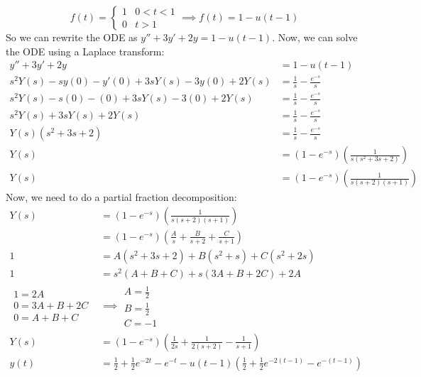 \documentclass[letterpaper, fontsize=11pt]{scrartcl} %
\numberwithin{equation}{section} %
\numberwithin{figure}{section} %
\numberwithin{table}{section} %
\begin{document}
\begin{enumerate}
\begin{enumerate}
\[ 
f(t) = \begin{cases} 
      1 & 0 < t < 1 \\
      0 & t > 1 
   \end{cases}
   \implies
   f(t) = 1 - u(t-1)
\]
So we can rewrite the ODE as $y'' + 3y' + 2y = 1 - u(t-1)$. Now, we can solve the ODE using a Laplace transform:
\begin{align*}
y'' + 3y' + 2y &= 1 - u(t-1)\\
s^2 Y(s) - sy(0) - y'(0) + 3sY(s) - 3y(0) + 2Y(s) &= \frac{1}{s} - \frac{e^{-s}}{s}\\
s^2 Y(s) - s(0) - (0) + 3sY(s) - 3(0) + 2Y(s) &= \frac{1}{s} - \frac{e^{-s}}{s}\\
s^2 Y(s) + 3sY(s) + 2Y(s) &= \frac{1}{s} - \frac{e^{-s}}{s}\\
Y(s)\left(s^2 + 3s + 2\right) &= \frac{1}{s} - \frac{e^{-s}}{s}\\
Y(s) &= \left(1 - e^{-s}\right) \left( \frac{1}{s(s^2 + 3s + 2)}\right)\\
Y(s) &= \left(1 - e^{-s}\right) \left( \frac{1}{s(s+2)(s+1)}\right)
\end{align*}
Now, we need to do a partial fraction decomposition:
\begin{align*}
Y(s) &= \left(1 - e^{-s}\right) \left( \frac{1}{s(s+2)(s+1)}\right)\\
&= \left(1 - e^{-s}\right) \left(\frac{A}{s} + \frac{B}{s+2} + \frac{C}{s+1}\right)\\
1&= A\left(s^2 + 3s + 2 \right) + B \left(s^2 + s \right) + C \left(s^2 + 2s\right) \\
1&= s^2 ( A + B + C) + s(3A + B + 2C) + 2A \\
\begin{array}{c}
1 = 2A \\
0 = 3A + B + 2C \\
0 = A + B + C
\end{array}
&\implies
\begin{array}{c}
A = \frac{1}{2} \\
B = \frac{1}{2}\\
C = -1
\end{array} \\
Y(s) &= \left(1 - e^{-s}\right) \left(\frac{1}{2s} + \frac{1}{2(s+2)} - \frac{1}{s+1}\right)\\
y(t) &= \frac{1}{2} + \frac{1}{2}e^{-2t} - e^{-t} -u(t-1)\left(\frac{1}{2} + \frac{1}{2}e^{-2(t-1)} - e^{-(t-1)}\right)\\
\end{align*}



\end{enumerate}
\end{enumerate}
\end{document}
